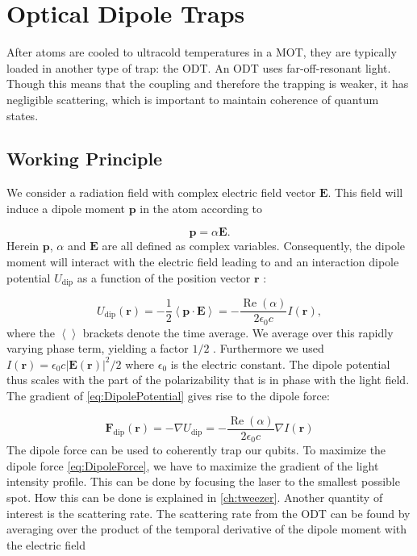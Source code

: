 \section{Optical Dipole Traps}\label{sec:ODT}

After atoms are cooled to ultracold temperatures in a \ac{MOT}, they are typically loaded in another type of trap: the \ac{ODT}. 
An ODT uses far-off-resonant light. Though this means that the coupling and therefore the trapping is weaker, it has negligible scattering, which is important to maintain coherence of quantum states. 

\subsection{Working Principle}

We consider a radiation field with complex electric field vector $\mathbf{E}$. 
This field will induce a dipole moment $\mathbf{p}$ in the atom according to 
	
\begin{equation}\label{eq:DipoleMoment}
	\mathbf{p} = \alpha \mathbf{E}.
\end{equation}
Herein $\mathbf{p}$, $\alpha$ and $\mathbf{E}$ are all defined as complex variables. Consequently, the dipole moment will interact with the electric field leading to and an interaction dipole potential $U_{\text{dip}}$ as a function of the position vector $\mathbf{r}$ \cite{Grimm2000}:

\begin{equation}\label{eq:DipolePotential}
	U_{\text{dip}}(\mathbf{r}) = 
	-\frac{1}{2} \left\langle \mathbf{p}\cdot\mathbf{E} \right\rangle=
	- \frac{\operatorname{Re}(\alpha)}{2\epsilon_0 c} I(\mathbf{r}),
\end{equation}
where the $\left\langle\right\rangle$ brackets denote the time average.
We average over this rapidly varying phase term, yielding a factor $1/2$ \cite{Grimm2000}.
Furthermore we used $I(\mathbf{r}) = \epsilon_0 c |\mathbf{E}(\mathbf{r})|^2/2$ where $\epsilon_0$ is the electric constant. 
The dipole potential thus scales with the part of the polarizability that is in phase with the light field.
The gradient of \cref{eq:DipolePotential} gives rise to the dipole force:

\begin{equation}\label{eq:DipoleForce}
	\mathbf{F}_{\text{dip}}(\mathbf{r}) 
	= - \nabla U_{\text{dip}}
	= - \frac{\operatorname{Re}(\alpha)}{2\epsilon_0c}\nabla I(\mathbf{r})
\end{equation}
The dipole force can be used to coherently trap our qubits. 
To maximize the dipole force \cref{eq:DipoleForce}, 
we have to maximize the gradient of the light intensity profile.
This can be done by focusing the laser to the smallest possible spot.
How this can be done is explained in \cref{ch:tweezer}. 
Another quantity of interest is the scattering rate.
The scattering rate from the ODT can be found by averaging over the product of the temporal derivative of the dipole moment with the electric field \cite{Grimm2000}

